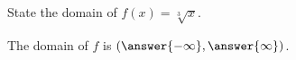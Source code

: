 \documentclass{ximera}
\author{Carl Stitz \and Jeff Zeager \and Bart Snapp \and Matthew Carr}
\begin{document}
\begin{exercise}



State the domain of $f(x)=\sqrt[3]{x}$.
\begin{center}
The domain of $f$ is $(\answer{-\infty},\answer{\infty})$.
\end{center}

\end{exercise}
\end{document}
